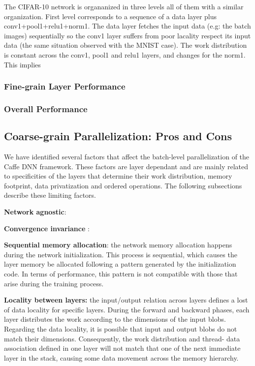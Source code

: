 The CIFAR-10 network is organanized in three levels all of them with a 
similar organization. First level corresponds to a sequence of a data 
layer plus conv1+pool1+relu1+norm1. The data layer fetches the input 
data (e.g: the batch images) sequentially so the conv1 layer suffers from 
poor lacality respect its input data (the same situation observed with 
the MNIST case). The work distribution is constant across the conv1, 
pool1 and relu1 layers, and changes for the norm1. This implies  

\subsubsection{Fine-grain Layer Performance}

\subsubsection{Overall Performance}

\subsection{Coarse-grain Parallelization: Pros and Cons}
We have identified several factors that affect the batch-level
parallelization of the Caffe DNN framework. These factors are
layer dependant and are mainly related to specificities of the
layers that determine their work distribution, memory footprint,
data privatization and ordered operations. The following subsections 
describe these limiting factors.

\textbf{Network agnostic}:

\textbf{Convergence invariance }:

\textbf{Sequential memory allocation}: the network memory allocation
happens during the network initialization. This process is sequential, 
which causes the layer memory be allocated following a
pattern generated by the initialization code. In terms of performance, 
this pattern is not compatible with those that arise during
the training process.

\textbf{Locality between layers:} the input/output relation across layers
defines a lost of data locality for specific layers. During the forward 
and backward phases, each layer distributes the work according to the 
dimensions of the input blobs. Regarding the data locality, it is 
possible that input and output blobs do not match
their dimensions. Consequently, the work distribution and thread-
data association defined in one layer will not match that one of the
next immediate layer in the stack, causing some data movement
across the memory hierarchy.

